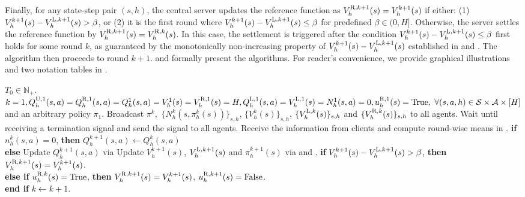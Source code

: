 \documentclass{article}
\newcommand{\U}{\textnormal{U}}
\newcommand{\LL}{\textnormal{L}}
\newcommand{\R}{\textnormal{R}}
\begin{document}
Finally, for any state-step pair $(s,h)$, the central server updates the reference function as $V_h^{\R,k+1}(s) = V_h^{k+1}(s)$ if either: (1) $V_h^{k+1}(s) - V_h^{\LL,k+1}(s) > \beta$, or (2) it is the first round where $V_h^{k+1}(s) - V_h^{\LL,k+1}(s) \leq \beta$ for predefined $\beta \in (0,H]$. Otherwise, the server settles the reference function by $V_h^{\R,k+1}(s) = V_h^{\R,k}(s)$. In this case, the settlement is triggered after the condition $V_h^{k+1}(s) - V_h^{\LL,k+1}(s) \leq \beta$ first holds for some round $k$, as guaranteed by the monotonically non-increasing property of $V_h^{k+1}(s) - V_h^{\LL,k+1}(s) $ established in  and . The algorithm then proceeds to round $k+1$.  and  formally present the algorithms. For reader's convenience, we provide graphical illustrations and two notation tables in .

\begin{algorithm}[ht!]
		\caption{FedQ-EarlySettled-LowCost (Central Server)}
		\label{alg_early_server}
		\begin{algorithmic}[1]
   $T_0\in\mathbb{N}_+$.
     $k=1,Q_h^{\U,1}(s,a) = Q_h^{\R,1}(s,a) = Q_h^1(s,a) = V_h^1(s) = V_h^{\R,1}(s) = H, Q_h^{\LL,1}(s,a) = V_h^{\LL,1}(s) = N_h^1(s,a) = 0,  u_h^{\R,1}(s) = \textnormal{True},\ \forall (s,a,h)\in \mathcal{S} \times \mathcal {A} \times [H]$ and an arbitrary policy $\pi_1$. 
   \STATE Broadcast $\pi^k,$ $\{N_h^k(s,\pi_{h}^k(s))\}_{s,h}$, $\{V_h^k(s)\}_{s,h}$, $\{V_h^{\LL,k}(s)\}_{s,h}$ and $\{V_h^{\R,k}(s)\}_{s,h}$ to all agents.
   \STATE Wait until receiving a termination signal and send the signal to all agents.
   \STATE Receive the information from clients and compute round-wise means in .
    \STATE \textbf{if } $n_h^k(s,a) = 0$, \textbf{then } $Q_h^{k+1}(s,a)\leftarrow Q_h^{k}(s,a)$ \\
    \textbf{else } Update $Q_h^{k+1}(s,a)$ via  
    \ENDFOR
    \STATE Update $V_h^{k+1}(s)$, $V_h^{\LL, k+1}(s)$ and $\pi_h^{k+1}(s)$ via  and .
	\STATE \textbf{if } $V_h^{k+1}(s)-V_h^{\LL, k+1}(s) > \beta$, \textbf{then } $V_h^{\R,k+1}(s) = V_h^{k+1}(s)$. \\
    \textbf{else if } $u_h^{\R,k} (s) = \textnormal{True}$, \textbf{then } $V_h^{\R,k+1}(s) = V_h^{k+1}(s)$, $u_h^{\R,k+1} (s) = \textnormal{False}$. \\
    \textbf{end if}
    \ENDFOR
    \STATE $k\gets k+1$.
			\ENDWHILE
		\end{algorithmic}
	\end{algorithm}
\end{document}
